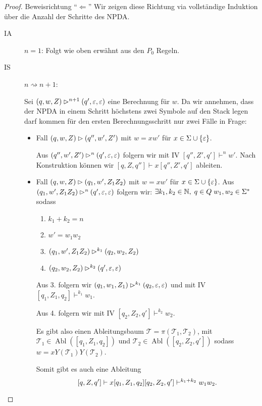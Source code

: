 \begin{proof}
    \item Beweisrichtung ``$\Leftarrow$''
     Wir zeigen diese Richtung via vollständige Induktion über die Anzahl der Schritte des \ac{NPDA}.
     \begin{description}
      \item[IA] $n=1$: Folgt wie oben erwähnt aus den $P_0$ Regeln.
      \item[IS] $n\rightsquigarrow n+1$:
      
      Sei $(q,w,Z) \rhd^{n+1} (q',\varepsilon,\varepsilon)$ eine Berechnung für $w$. Da wir annehmen, 
      dass der \ac{NPDA} in einem Schritt höchstens zwei Symbole auf den Stack legen darf kommen für den ersten Berechnungsschritt nur zwei Fälle in Frage:
      \begin{itemize}
      \item Fall $(q,w,Z)\rhd (q'', w',Z')$ mit $w=xw'$ für $x\in\Sigma\cup\{\varepsilon\}$.
      
      Aus $(q'', w',Z')\rhd^n (q',\varepsilon,\varepsilon)$ folgern wir mit IV
      $[q'', Z',q']\vdash^n w'$.
      Nach Konstruktion können wir $[q,Z,q'']\vdash x [q'', Z',q']$ ableiten.

      
      \item Fall $(q,w,Z)\rhd (q_1, w',Z_1Z_2)$ mit $w=xw'$ für $x\in\Sigma\cup\{\varepsilon\}$.
            Aus $(q_1, w',Z_1Z_2)\rhd^n (q',\varepsilon,\varepsilon)$ folgern wir:
      $\exists k_1,k_2\in\mathbb{N}, \; q\in Q \; w_1,w_2\in \Sigma^*$ sodass 
      \begin{enumerate}
      \item $k_1+k_2=n$
      \item $w'=w_1w_2$
      \item $(q_1, w',Z_1Z_2)\rhd^{k_1} (q_2, w_2,Z_2)$
      \item $(q_2, w_2,Z_2)\rhd^{k_2} (q',\varepsilon,\varepsilon)$
      \end{enumerate}
      
      Aus 3. folgern wir $(q_1, w_1,Z_1)\rhd^{k_1} (q_2, \varepsilon,\varepsilon)$ und mit IV
      $[q_1, Z_1, q_2] \vdash^{k_1} w_1$.
      
      Aus 4. folgern wir mit IV $[q_2, Z_2, q'] \vdash^{k_2} w_2$.
      
      Es gibt also einen Ableitungsbaum $\mathcal{T} = \pi(\mathcal{T}_1,\mathcal{T}_2)$, mit $\mathcal{T}_1 \in \operatorname{Abl}([q_1, Z_1, q_2])$ und $\mathcal{T}_2 \in \operatorname{Abl}([q_2, Z_2, q'])$ sodass $w = xY(\mathcal{T}_1)Y(\mathcal{T}_2)$.
      
      Somit gibt es auch eine Ableitung 
      $$[q, Z, q'] \vdash x[q_1,Z_1,q_2][q_2, Z_2, q'] \vdash^{k_1+k_2} w_1w_2. \qedhere$$
      \end{itemize}
     \end{description}
\end{proof}








